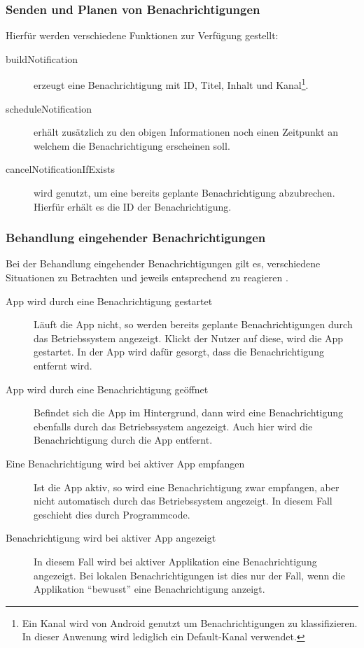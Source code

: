 \subsubsection{Senden und Planen von Benachrichtigungen}
Hierfür werden verschiedene Funktionen zur Verfügung gestellt:
\begin{description}
    \item[buildNotification] erzeugt eine Benachrichtigung mit ID, Titel, Inhalt und Kanal\footnote{Ein Kanal wird von Android genutzt um Benachrichtigungen zu klassifizieren. In dieser Anwenung wird lediglich ein Default-Kanal verwendet.}.
    \item[scheduleNotification] erhält zusätzlich zu den obigen Informationen noch einen Zeitpunkt an welchem die Benachrichtigung erscheinen soll.
    \item[cancelNotificationIfExists] wird genutzt, um eine bereits geplante Benachrichtigung abzubrechen. Hierfür erhält es die ID der Benachrichtigung.
\end{description}

\subsubsection{Behandlung eingehender Benachrichtigungen}
Bei der Behandlung eingehender Benachrichtigungen gilt es,
verschiedene Situationen zu Betrachten und jeweils entsprechend zu reagieren \cite{Introduc87:online}.
\begin{description}
    \item[App wird durch eine Benachrichtigung gestartet]
    Läuft die App nicht, so werden bereits geplante Benachrichtigungen durch das Betriebssystem angezeigt.
    Klickt der Nutzer auf diese, wird die App gestartet.
    In der App wird dafür gesorgt, dass die Benachrichtigung entfernt wird.

    \item[App wird durch eine Benachrichtigung geöffnet]
    Befindet sich die App im Hintergrund,
    dann wird eine Benachrichtigung ebenfalls durch das Betriebssystem angezeigt.
    Auch hier wird die Benachrichtigung durch die App entfernt.

    \item[Eine Benachrichtigung wird bei aktiver App empfangen]
    Ist die App aktiv, so wird eine Benachrichtigung zwar empfangen,
    aber nicht automatisch durch das Betriebssystem angezeigt.
    In diesem Fall geschieht dies durch Programmcode.

    \item[Benachrichtigung wird bei aktiver App angezeigt]
    In diesem Fall wird bei aktiver Applikation eine Benachrichtigung angezeigt.
    Bei lokalen Benachrichtigungen ist dies nur der Fall,
    wenn die Applikation \enquote{bewusst} eine Benachrichtigung anzeigt.
\end{description}

